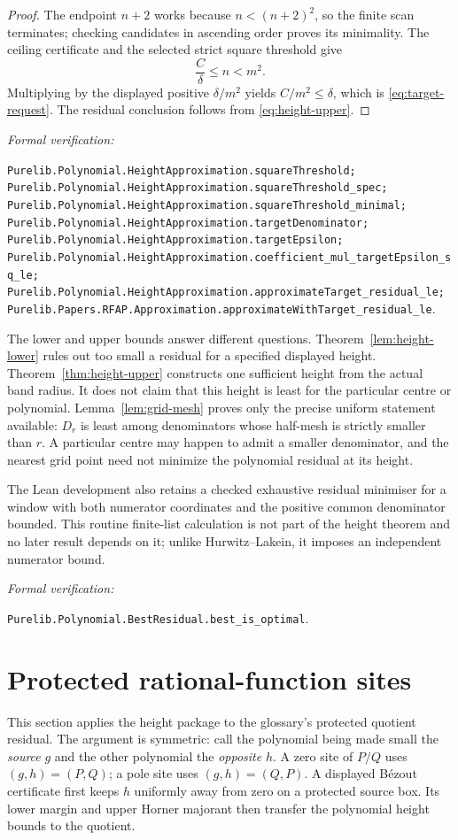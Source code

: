\documentclass[11pt]{article}
\newcommand{\leanref}[1]{\par\smallskip\noindent
  \emph{Formal verification:}\par\nobreak
  {\raggedright\nolinkurl{#1}.\par}}
\begin{document}
\begin{proof}
The endpoint $n+2$ works because $n<(n+2)^2$, so the finite scan terminates;
checking candidates in ascending order proves its minimality.  The ceiling
certificate and the selected strict square threshold give
\[
                    \frac C\delta\le n<m^2.
\]
Multiplying by the displayed positive $\delta/m^2$ yields
$C/m^2\le\delta$, which is \eqref{eq:target-request}.  The residual
conclusion follows from \eqref{eq:height-upper}.
\end{proof}

\leanref{Purelib.Polynomial.HeightApproximation.squareThreshold;
Purelib.Polynomial.HeightApproximation.squareThreshold_spec;
Purelib.Polynomial.HeightApproximation.squareThreshold_minimal;
Purelib.Polynomial.HeightApproximation.targetDenominator;
Purelib.Polynomial.HeightApproximation.targetEpsilon;
Purelib.Polynomial.HeightApproximation.coefficient_mul_targetEpsilon_sq_le;
Purelib.Polynomial.HeightApproximation.approximateTarget_residual_le;
Purelib.Papers.RFAP.Approximation.approximateWithTarget_residual_le}

The lower and upper bounds answer different questions.  Theorem~\ref{lem:height-lower}
rules out too small a residual for a specified displayed height.  Theorem~\ref{thm:height-upper}
constructs one sufficient height from the actual band radius.  It does not
claim that this height is least for the particular centre or polynomial.
Lemma~\ref{lem:grid-mesh} proves only the precise uniform statement available:
$D_r$ is least among denominators whose half-mesh is strictly smaller than
$r$.  A particular centre may happen to admit a smaller denominator, and
the nearest grid point need not minimize the polynomial residual at its
height.

The Lean development also retains a checked exhaustive residual minimiser for
a window with both numerator coordinates and the positive common denominator
bounded.  This routine finite-list calculation is not part of the height
theorem and no later result depends on it; unlike Hurwitz--Lakein, it imposes
an independent numerator bound.

\leanref{Purelib.Polynomial.BestResidual.best_is_optimal}

\section{Protected rational-function sites}
\label{sec:quotients}

This section applies the height package to the glossary's protected quotient
residual.  The argument is symmetric: call the polynomial being made small
the \emph{source} $g$ and the other polynomial the \emph{opposite} $h$.  A
zero site of $P/Q$ uses $(g,h)=(P,Q)$; a pole site uses $(g,h)=(Q,P)$.  A
displayed B\'ezout certificate first keeps $h$ uniformly away from zero on a
protected source box.  Its lower margin and upper Horner majorant then
transfer the polynomial height bounds to the quotient.
\end{document}
